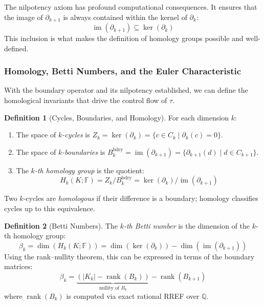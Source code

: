 \documentclass[manuscript, nonacm, review=false]{acmart}
\theoremstyle{definition}
\newtheorem{definition}{Definition}[section]
\theoremstyle{plain}
\newcommand{\Q}{\mathbb{Q}}
\newcommand{\F}{\mathbb{F}}
\newcommand{\rank}{\operatorname{rank}}
\newcommand{\img}{\operatorname{im}}
\newcommand{\toposLang}{\ensuremath{\tau}\text{-Lang}}
\begin{document}
The nilpotency axiom has profound computational consequences. It ensures that the image of $\partial_{k+1}$ is always contained within the kernel of $\partial_k$:
\begin{equation}
    \img(\partial_{k+1}) \subseteq \ker(\partial_k)
\end{equation}
This inclusion is what makes the definition of homology groups possible and well-defined.


\subsubsection{Homology, Betti Numbers, and the Euler Characteristic}

With the boundary operator and its nilpotency established, we can define the homological invariants that drive the control flow of \toposLang{}.

\begin{definition}[Cycles, Boundaries, and Homology]
\label{def:homology}
For each dimension $k$:
\begin{enumerate}[label=(\roman*)]
    \item The space of \emph{$k$-cycles} is $Z_k = \ker(\partial_k) = \{c \in C_k \mid \partial_k(c) = 0\}$.
    \item The space of \emph{$k$-boundaries} is $B_k^{\text{bdry}} = \img(\partial_{k+1}) = \{\partial_{k+1}(d) \mid d \in C_{k+1}\}$.
    \item The \emph{$k$-th homology group} is the quotient:
    \begin{equation}
        H_k(K; \F) = Z_k / B_k^{\text{bdry}} = \ker(\partial_k) / \img(\partial_{k+1})
    \end{equation}
\end{enumerate}
Two $k$-cycles are \emph{homologous} if their difference is a boundary; homology classifies cycles up to this equivalence.
\end{definition}

\begin{definition}[Betti Numbers]
\label{def:betti}
The \emph{$k$-th Betti number} is the dimension of the $k$-th homology group:
\begin{equation}
    \beta_k = \dim(H_k(K; \F)) = \dim(\ker(\partial_k)) - \dim(\img(\partial_{k+1}))
\end{equation}
Using the rank--nullity theorem, this can be expressed in terms of the boundary matrices:
\begin{equation}
    \beta_k = \underbrace{(|K_k| - \rank(B_k))}_{\text{nullity of } B_k} - \rank(B_{k+1})
    \label{eq:betti_formula}
\end{equation}
where $\rank(B_k)$ is computed via exact rational RREF over $\Q$.
\end{definition}
\end{document}
